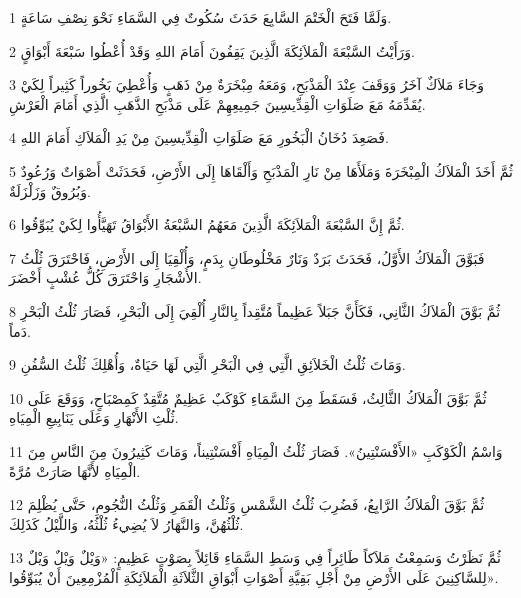 \par 1 وَلَمَّا فَتَحَ الْخَتْمَ السَّابِعَ حَدَثَ سُكُوتٌ فِي السَّمَاءِ نَحْوَ نِصْفِ سَاعَةٍ.
\par 2 وَرَأَيْتُ السَّبْعَةَ الْمَلاَئِكَةَ الَّذِينَ يَقِفُونَ أَمَامَ اللهِ وَقَدْ أُعْطُوا سَبْعَةَ أَبْوَاقٍ.
\par 3 وَجَاءَ مَلاَكٌ آخَرُ وَوَقَفَ عِنْدَ الْمَذْبَحِ، وَمَعَهُ مِبْخَرَةٌ مِنْ ذَهَبٍ وَأُعْطِيَ بَخُوراً كَثِيراً لِكَيْ يُقَدِّمَهُ مَعَ صَلَوَاتِ الْقِدِّيسِينَ جَمِيعِهِمْ عَلَى مَذْبَحِ الذَّهَبِ الَّذِي أَمَامَ الْعَرْشِ.
\par 4 فَصَعِدَ دُخَانُ الْبَخُورِ مَعَ صَلَوَاتِ الْقِدِّيسِينَ مِنْ يَدِ الْمَلاَكِ أَمَامَ اللهِ.
\par 5 ثُمَّ أَخَذَ الْمَلاَكُ الْمِبْخَرَةَ وَمَلَأَهَا مِنْ نَارِ الْمَذْبَحِ وَأَلْقَاهَا إِلَى الأَرْضِ، فَحَدَثَتْ أَصْوَاتٌ وَرُعُودٌ وَبُرُوقٌ وَزَلْزَلَةٌ.
\par 6 ثُمَّ إِنَّ السَّبْعَةَ الْمَلاَئِكَةَ الَّذِينَ مَعَهُمُ السَّبْعَةُ الأَبْوَاقُ تَهَيَّأُوا لِكَيْ يُبَوِّقُوا.
\par 7 فَبَوَّقَ الْمَلاَكُ الأَوَّلُ، فَحَدَثَ بَرَدٌ وَنَارٌ مَخْلُوطَانِ بِدَمٍ، وَأُلْقِيَا إِلَى الأَرْضِ، فَاحْتَرَقَ ثُلْثُ الأَشْجَارِ وَاحْتَرَقَ كُلُّ عُشْبٍ أَخْضَرَ.
\par 8 ثُمَّ بَوَّقَ الْمَلاَكُ الثَّانِي، فَكَأَنَّ جَبَلاً عَظِيماً مُتَّقِداً بِالنَّارِ أُلْقِيَ إِلَى الْبَحْرِ، فَصَارَ ثُلْثُ الْبَحْرِ دَماً.
\par 9 وَمَاتَ ثُلْثُ الْخَلاَئِقِ الَّتِي فِي الْبَحْرِ الَّتِي لَهَا حَيَاةٌ، وَأُهْلِكَ ثُلْثُ السُّفُنِ.
\par 10 ثُمَّ بَوَّقَ الْمَلاَكُ الثَّالِثُ، فَسَقَطَ مِنَ السَّمَاءِ كَوْكَبٌ عَظِيمٌ مُتَّقِدٌ كَمِصْبَاحٍ، وَوَقَعَ عَلَى ثُلْثِ الأَنْهَارِ وَعَلَى يَنَابِيعِ الْمِيَاهِ.
\par 11 وَاسْمُ الْكَوْكَبِ «الأَفْسَنْتِينُ». فَصَارَ ثُلْثُ الْمِيَاهِ أَفْسَنْتِيناً، وَمَاتَ كَثِيرُونَ مِنَ النَّاسِ مِنَ الْمِيَاهِ لأَنَّهَا صَارَتْ مُرَّةً.
\par 12 ثُمَّ بَوَّقَ الْمَلاَكُ الرَّابِعُ، فَضُرِبَ ثُلْثُ الشَّمْسِ وَثُلْثُ الْقَمَرِ وَثُلْثُ النُّجُومِ، حَتَّى يُظْلِمَ ثُلْثُهُنَّ، وَالنَّهَارُ لاَ يُضِيءُ ثُلْثُهُ، وَاللَّيْلُ كَذَلِكَ.
\par 13 ثُمَّ نَظَرْتُ وَسَمِعْتُ مَلاَكاً طَائِراً فِي وَسَطِ السَّمَاءِ قَائِلاً بِصَوْتٍ عَظِيمٍ: «وَيْلٌ وَيْلٌ وَيْلٌ لِلسَّاكِنِينَ عَلَى الأَرْضِ مِنْ أَجْلِ بَقِيَّةِ أَصْوَاتِ أَبْوَاقِ الثَّلاَثَةِ الْمَلاَئِكَةِ الْمُزْمِعِينَ أَنْ يُبَوِّقُوا».

